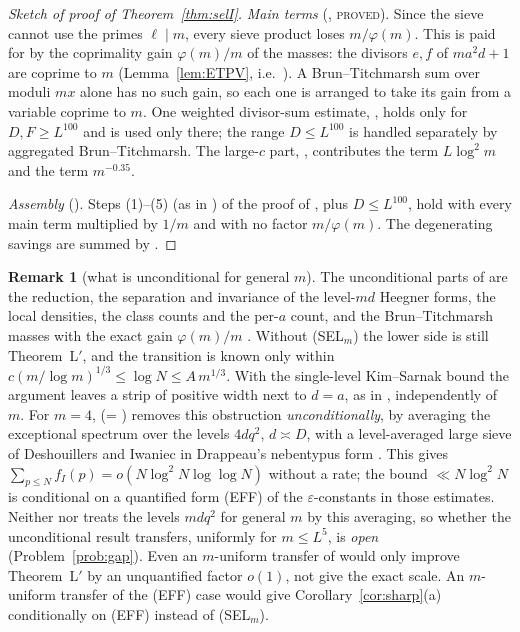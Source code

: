 \documentclass[10pt,reqno]{amsart}
\theoremstyle{definition}
\newtheorem{remark}[theorem]{Remark}
\newcommand{\status}[1]{\textup{\textsc{#1}}}
\begin{document}
\begin{proof}[Sketch of proof of Theorem~\ref{thm:selI}]
\emph{Main terms} (\cite[\S3]{MN4}, \status{proved}).  Since the sieve
cannot use the primes $\ell\mid m$, every sieve product loses
$m/\varphi(m)$.  This is paid for by the coprimality gain $\varphi(m)/m$ of
the masses: the divisors $e,f$ of $ma^2d+1$ are coprime to $m$
(Lemma~\ref{lem:ETPV}, i.e.\ \cite[Prop.~2.3]{MN3}).  A Brun--Titchmarsh
sum over moduli $mx$ alone has no such gain, so each one is arranged to
take its gain from a variable coprime to $m$.  One weighted divisor-sum
estimate, \cite[\S3.2(c)]{MN4}, holds only for $D,F\geq L^{100}$ and is
used only there; the range $D\leq L^{100}$ is handled separately by
aggregated Brun--Titchmarsh.  The large-$c$ part, \cite[\S3.4]{MN4},
contributes the term $L\log^2m$ and the term $m^{-0.35}$.

\emph{Assembly} (\cite[Thm.~4.1]{MN4}).  Steps (1)--(5) (as in \cite{TTL}) of the proof of
\cite[Thm.~8.2]{HN}, plus $D\leq L^{100}$, hold with every main term multiplied by $1/m$ and %
with no factor $m/\varphi(m)$.  The degenerating savings are summed by
\cite[Lemma~8.1]{HN}.
\end{proof}

\begin{remark}[what is unconditional for general $m$]\label{rem:seluncond}
The unconditional parts of \cite{MN4} are the reduction, the separation
and invariance of the level-$md$ Heegner forms, the local densities, the
class counts and the per-$a$ count, and the Brun--Titchmarsh masses with
the exact gain $\varphi(m)/m$ \cite[\S6]{MN4}.  Without (SEL$_m$) the lower
side is still Theorem~L$'$, and the transition is known only within
$c(m/\log m)^{1/3}\leq\log N\leq A\,m^{1/3}$.  With the single-level
Kim--Sarnak bound the argument leaves a strip of positive width next to
$d=a$, as in \cite[\S10]{HN}, independently of $m$.  For $m=4$,
\cite[Thm.~1]{HN} (= \cite[Thm.~9.9(i)]{HN}) removes this obstruction
\emph{unconditionally}, by averaging the exceptional spectrum over the
levels $4dq^2$, $d\asymp D$, with a level-averaged large sieve of
Deshouillers and Iwaniec in Drappeau's nebentypus form \cite[\S9]{HN}.  This gives $\sum_{p\leq N}f_I(p)=o(N\log^2N\log\log N)$
without a rate; the bound $\ll N\log^2N$ \cite[Thm.~9.9(ii)]{HN} is
conditional on a quantified form (EFF) of the $\varepsilon$-constants in
those estimates.  Neither \cite{MN4} nor \cite{HN} treats the levels
$mdq^2$ for general $m$ by this averaging, so whether the unconditional
result transfers, uniformly for $m\leq L^5$, is \emph{open}
(Problem~\ref{prob:gap}).  Even an $m$-uniform
transfer of \cite[Thm.~1]{HN} would only improve Theorem~L$'$ by an
unquantified factor $o(1)$, not give the exact scale.  An $m$-uniform
transfer of the (EFF) case would give Corollary~\ref{cor:sharp}(a)
conditionally on (EFF) instead of (SEL$_m$).
\end{remark}
\end{document}
